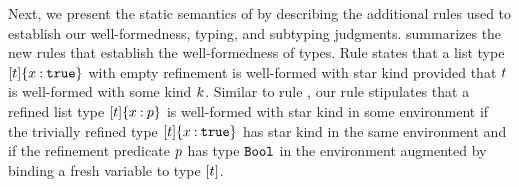          
%
Next, we present the static semantics of \sysrfd by describing
the additional rules used to establish our
well-formedness, typing, and subtyping judgments.
%
 summarizes the new rules
that establish the well-formedness of types.
%
Rule \wtList states that a list type 
${{[t]}\{x \mathbin{:} \mathtt{true}\}}$
with empty refinement
is well-formed with star kind provided that 
$t$ is well-formed with some kind $k$.
%
Similar to rule \wtRefn, our rule \wtListR 
stipulates that a refined list type ${{[t]}\{x \mathbin{:} p\}}$
is well-formed with star kind in some environment
if the trivially refined type ${{[t]}\{x \mathbin{:} \mathtt{true}\}}$
has star kind in the same environment and if
the refinement predicate $p$ has type $\texttt{Bool}$
in the environment augmented by binding a fresh variable to type $[t]$.

